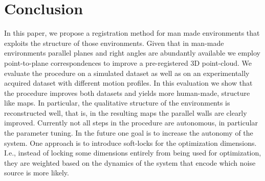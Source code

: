 \section{Conclusion}

In this paper, we propose a registration method for man made environments that exploits the structure of those environments. 
Given that in man-made environments parallel planes and right angles are abundantly available we employ point-to-plane correspondences to improve a pre-registered 3D point-cloud. 
We evaluate the procedure on a simulated dataset as well as on an experimentally acquired dataset with different motion profiles. 
In this evaluation we show that the procedure improves both datasets and yields more human-made, structure like maps. 
In particular, the qualitative structure of the environments is reconstructed well, that is, in the resulting maps the parallel walls are clearly improved.
Currently not all steps in the procedure are autonomous, in particular the parameter tuning. 
In the future one goal is to increase the autonomy of the system.
One approach is to introduce soft-locks for the optimization dimensions.
I.e., instead of locking some dimensions entirely from being used for optimization, they are weighted based on the dynamics of the system that encode which noise source is more likely.  


